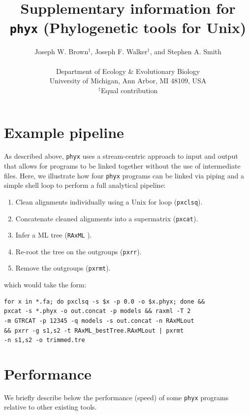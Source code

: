 \documentclass{article}
\begin{document}
\title{Supplementary information for \texttt{phyx} (Phylogenetic tools for Unix)}

\author{Joseph W. Brown$^{\dagger}$, Joseph F. Walker$^{\dagger}$, and Stephen A. Smith\\\\
\normalsize{Department of Ecology \& Evolutionary Biology}\\
\normalsize{University of Michigan, Ann Arbor, MI 48109, USA}\\
\normalsize{$^{\dagger}$Equal contribution}}
\date{} %
\maketitle

\section{Example pipeline}
As described above, \texttt{phyx} uses a stream-centric approach to input and output that allows for programs to be linked together without the use of intermediate files. Here, we illustrate how four \texttt{phyx} programs can be linked via piping
and a simple shell loop to perform a full analytical pipeline:
\begin{enumerate}
\item Clean alignments individually using a Unix for loop (\texttt{pxclsq}).
\item Concatenate cleaned alignments into a supermatrix (\texttt{pxcat}).
\item Infer a ML tree (\texttt{RAxML} \citep{Stamatakis2014}).
\item Re-root the tree on the outgroups (\texttt{pxrr}).
\item Remove the outgroups (\texttt{pxrmt}).
\end{enumerate}
which would take the form:

\begin{verbatim}
for x in *.fa; do pxclsq -s $x -p 0.0 -o $x.phyx; done &&
pxcat -s *.phyx -o out.concat -p models && raxml -T 2
-m GTRCAT -p 12345 -q models -s out.concat -n RAxMLout
&& pxrr -g s1,s2 -t RAxML_bestTree.RAxMLout | pxrmt
-n s1,s2 -o trimmed.tre
\end{verbatim}

\section{Performance}
We briefly describe below the performance (speed) of some \texttt{phyx} programs relative to other existing tools.
\end{document}
